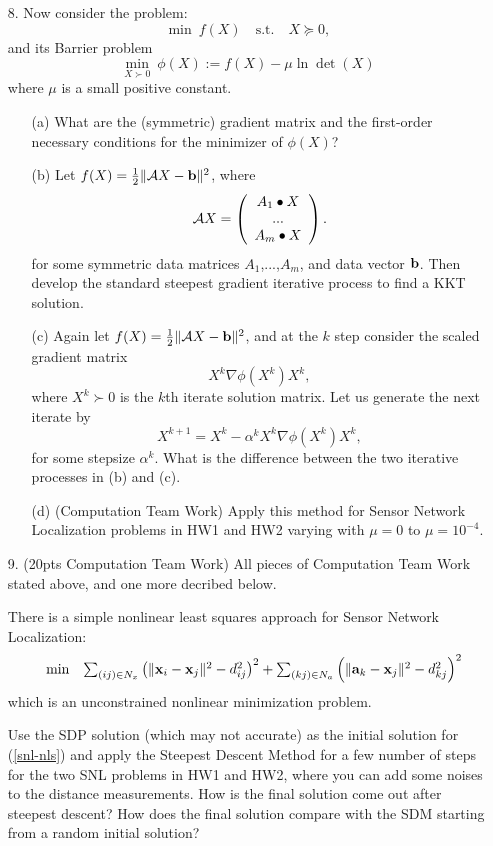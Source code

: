 \documentclass[12pt,letterpaper]{article}
\renewcommand\a{{\bf a}}
\renewcommand\b{{\bf b}}
\newcommand\x{{\bf x}}
\begin{document}
\begin{enumerate}
\item[8.] Now consider the problem:
\[\min\ f(X)\quad \mbox{s.t.}\quad X\succeq 0,\]
and its Barrier problem
\[\min_{X\succ 0}\ \phi(X):=f(X)-\mu\ln\det(X)\]
where $\mu$ is a small positive constant.

\begin{itemize}
\item[(a)] What are the (symmetric) gradient matrix and the first-order necessary conditions for the minimizer of $\phi(X)$?

\item[(b)] Let $f(X)=\frac{1}{2}\|{\cal A}X-\b\|^2$, where
\[{\cal A}X=\left(\begin{array}{c}
                           A_1\bullet X\\
                           ...\\
                           A_m\bullet X
                           \end{array}\right).\]
for some symmetric data matrices $A_1$,...,$A_m$, and data vector $\b$.
Then develop the standard steepest gradient iterative process to find a KKT solution.

\item[(c)] Again let $f(X)=\frac{1}{2}\|{\cal A}X-\b\|^2$, and at the $k$ step consider the scaled gradient matrix
\[X^k\nabla\phi(X^k)X^k,\]
where $X^k\succ 0$ is the $k$th iterate solution matrix. Let us generate the next iterate by
\[X^{k+1}=X^k-\alpha^kX^k\nabla\phi(X^k)X^k,\]
for some stepsize $\alpha^k$. What is the difference between the two iterative processes in (b) and (c).

\item[(d)] (Computation Team Work) Apply this method for Sensor Network Localization problems in HW1 and HW2 varying
with $\mu=0$ to $\mu=10^{-4}$.
\end{itemize}

\item[9.] (20pts Computation Team Work) 
All pieces of Computation Team Work stated above, and one more decribed below.

There is a simple nonlinear least squares approach for Sensor Network Localization:
\begin{equation}\label{snl-nls}
\begin{array}{lll}
&\min        & \sum_{(ij)\in N_x}\left(\|\x_i-\x_j\|^2 - d_{ij}^2\right)^2+\sum_{(kj)\in N_a} \left(\|\a_k-\x_j\|^2 - d_{kj}^2\right)^2
\end{array}
\end{equation}
which is an unconstrained nonlinear minimization problem.

Use the SDP solution (which may not accurate) as the initial solution for (\ref{snl-nls}) and apply the Steepest Descent Method for a few number of steps for the two SNL problems in HW1 and HW2, where you can add some noises to the distance measurements. How is the final solution come out after steepest descent? How does the final solution compare with the SDM starting from a random initial solution?

\end{enumerate}
\end{document}
